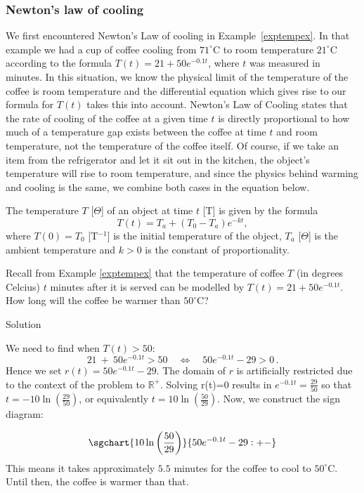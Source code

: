 \subsubsection{Newton's law of cooling}
 We first encountered Newton's Law of cooling in Example~\ref{exptempex}. In that example we had a cup of coffee cooling from $71^{\circ}\mbox{C}$ to room temperature $21^{\circ}\mbox{C}$ according to the formula $T(t) = 21 + 50 e^{-0.1 t}$, where $t$ was measured in minutes.  In this situation, we know the physical limit of the temperature of the coffee is room temperature and the differential equation which gives rise to our formula for $T(t)$ takes this into account.  Newton's Law of Cooling states that the rate of cooling of the coffee at a given time $t$ is directly proportional to how much of a temperature gap exists between the coffee at time $t$ and room temperature, not the temperature of the coffee itself.  Of course, if we take an item from the refrigerator and let it sit out in the kitchen, the object's temperature will rise to room temperature, and since the physics behind warming and cooling is the same, we combine both cases in the equation below.

The temperature $T$ [$\Theta$] of an object  at time $t$ [T] is given by the formula 
\begin{equation}
T(t) = T_{a} + \left(T_0 - T_{a}\right) e^{-kt},
\end{equation}
 where $T(0) = T_0$ [T$^{-1}$] is the initial temperature of the object, $T_{a}$ [$\Theta$] is the ambient temperature and $k>0$ is the constant of proportionality.

\begin{example}
  Recall from Example \ref{exptempex} that the temperature of coffee $T$ (in degrees Celcius) $t$ minutes after it is served can be modelled by $T(t) = 21 + 50 e^{-0.1 t}$.  How long will the coffee be warmer than $50^{\circ}\mbox{C}$?

Solution 

 We need to find when $T(t) > 50$:
 $$21~+~50e^{-0.1 t}>50\quad\Leftrightarrow\quad50 e^{-0.1 t} - 29 > 0\,.$$ 
 Hence we set $r(t)=50e^{-0.1 t} - 29$.  The domain of $r$ is artificially restricted due to the context of the problem to   $\mathbb{R}^+$.  Solving r(t)=0 results in $e^{-0.1t} = \frac{29}{50}$ so that $t = -10\ln\left(\frac{29}{50}\right)$, or equivalently $t = 10\ln\left(\frac{50}{29}\right)$. Now, we construct the sign diagram:

$$
\sgchart{10\ln\left(\frac{50}{29}\right)} {50 e^{-0.1 t} - 29: +-}
$$
This means it takes approximately $5.5$ minutes for the coffee to cool to $50^{\circ}\mbox{C}$.  Until then, the coffee is warmer than that.
\end{example}

